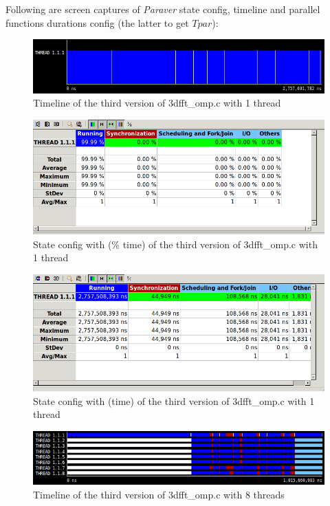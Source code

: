 \documentclass[12]{article}
\begin{document}
\bigskip
Following are screen captures of \textit{Paraver} state config, timeline and parallel functions durations config (the latter to get $T{par}$):

\bigskip

\begin{figure}[H]
\centering  
\includegraphics[scale=0.5]{images/megaImproved_3dfft/1threadTimeline.PNG}
    \caption{Timeline of the third version of 3dfft\_omp.c with 1 thread}
\end{figure}

\begin{figure}[H]
\centering  
\includegraphics[scale=0.5]{images/megaImproved_3dfft/1threadPercentage.PNG}
    \caption{State config with (\% time) of the third version of 3dfft\_omp.c with 1 thread}
\end{figure}

\begin{figure}[H]
\centering  
\includegraphics[scale=0.5]{images/megaImproved_3dfft/1thread.PNG}
    \caption{State config with (time) of the third version of 3dfft\_omp.c with 1 thread}
\end{figure}
    

\begin{figure}[H]
\centering  
\includegraphics[scale=0.5]{images/megaImproved_3dfft/8threadsTimeline.PNG}
    \caption{Timeline of the third version of 3dfft\_omp.c with 8 threads}
\end{figure}
    
\end{document}
